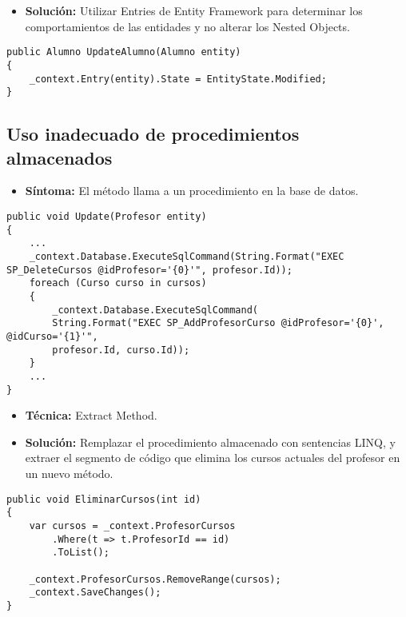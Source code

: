 \begin{itemize}
	\item \textbf{Solución:} Utilizar Entries de Entity Framework para determinar los comportamientos de las entidades y no alterar los Nested Objects.
\end{itemize}

\begin{lstlisting}[language={[Sharp]C}]
public Alumno UpdateAlumno(Alumno entity)
{
	_context.Entry(entity).State = EntityState.Modified;
}
\end{lstlisting}

	

\subsection{Uso inadecuado de procedimientos almacenados}
\begin{itemize}
	\item \textbf{Síntoma:} El método llama a un procedimiento en la base de datos.
\end{itemize}

\begin{lstlisting}[language={[Sharp]C}]
public void Update(Profesor entity)
{
	...
	_context.Database.ExecuteSqlCommand(String.Format("EXEC SP_DeleteCursos @idProfesor='{0}'", profesor.Id));
	foreach (Curso curso in cursos)
	{
		_context.Database.ExecuteSqlCommand(
		String.Format("EXEC SP_AddProfesorCurso @idProfesor='{0}', @idCurso='{1}'", 
		profesor.Id, curso.Id));
	}
	...
}
\end{lstlisting}

\begin{itemize}
	\item \textbf{Técnica:} Extract Method.
	\item \textbf{Solución:} Remplazar el procedimiento almacenado con sentencias LINQ, y extraer el segmento de código que elimina los cursos actuales del profesor en un nuevo método.
\end{itemize}

\begin{lstlisting}[language={[Sharp]C}]
public void EliminarCursos(int id)
{
	var cursos = _context.ProfesorCursos
		.Where(t => t.ProfesorId == id)
		.ToList();
	
	_context.ProfesorCursos.RemoveRange(cursos);
	_context.SaveChanges();
}
\end{lstlisting}
	

